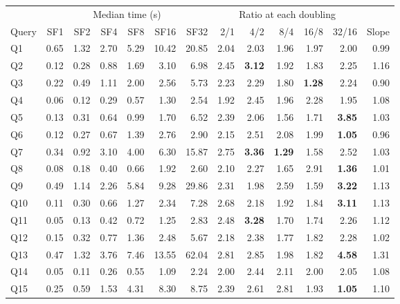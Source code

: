 \documentclass[11pt,a4paper]{article}
\begin{document}
\begin{table}[H]
\centering
\footnotesize
\setlength{\tabcolsep}{3.6pt}
\begin{tabular}{@{}lrrrrrrrrrrrr@{}}
\toprule
 & \multicolumn{6}{c}{Median time (s)} & \multicolumn{5}{c}{Ratio at each doubling} & \\
\cmidrule(lr){2-7}\cmidrule(lr){8-12}
Query & SF1 & SF2 & SF4 & SF8 & SF16 & SF32 & 2/1 & 4/2 & 8/4 & 16/8 & 32/16 & Slope \\
\midrule
Q1  & 0.65 & 1.32 & 2.70  & 5.29  & 10.42 & 20.85 & 2.04 & 2.03 & 1.96 & 1.97 & 2.00 & 0.99 \\
Q2  & 0.12 & 0.28 & 0.88  & 1.69  & 3.10  & 6.98  & 2.45 & \textbf{3.12} & 1.92 & 1.83 & 2.25 & 1.16 \\
Q3  & 0.22 & 0.49 & 1.11  & 2.00  & 2.56  & 5.73  & 2.23 & 2.29 & 1.80 & \textbf{1.28} & 2.24 & 0.90 \\
Q4  & 0.06 & 0.12 & 0.29  & 0.57  & 1.30  & 2.54  & 1.92 & 2.45 & 1.96 & 2.28 & 1.95 & 1.08 \\
Q5  & 0.13 & 0.31 & 0.64  & 0.99  & 1.70  & 6.52  & 2.39 & 2.06 & 1.56 & 1.71 & \textbf{3.85} & 1.03 \\
Q6  & 0.12 & 0.27 & 0.67  & 1.39  & 2.76  & 2.90  & 2.15 & 2.51 & 2.08 & 1.99 & \textbf{1.05} & 0.96 \\
Q7  & 0.34 & 0.92 & 3.10  & 4.00  & 6.30  & 15.87 & 2.75 & \textbf{3.36} & \textbf{1.29} & 1.58 & 2.52 & 1.03 \\
Q8  & 0.08 & 0.18 & 0.40  & 0.66  & 1.92  & 2.60  & 2.10 & 2.27 & 1.65 & 2.91 & \textbf{1.36} & 1.01 \\
Q9  & 0.49 & 1.14 & 2.26  & 5.84  & 9.28  & 29.86 & 2.31 & 1.98 & 2.59 & 1.59 & \textbf{3.22} & 1.13 \\
Q10 & 0.11 & 0.30 & 0.66  & 1.27  & 2.34  & 7.28  & 2.68 & 2.18 & 1.92 & 1.84 & \textbf{3.11} & 1.13 \\
Q11 & 0.05 & 0.13 & 0.42  & 0.72  & 1.25  & 2.83  & 2.48 & \textbf{3.28} & 1.70 & 1.74 & 2.26 & 1.12 \\
Q12 & 0.15 & 0.32 & 0.77  & 1.36  & 2.48  & 5.67  & 2.18 & 2.38 & 1.77 & 1.82 & 2.28 & 1.02 \\
Q13 & 0.47 & 1.32 & 3.76  & 7.46  & 13.55 & 62.04 & 2.81 & 2.85 & 1.98 & 1.82 & \textbf{4.58} & 1.31 \\
Q14 & 0.05 & 0.11 & 0.26  & 0.55  & 1.09  & 2.24  & 2.00 & 2.44 & 2.11 & 2.00 & 2.05 & 1.08 \\
Q15 & 0.25 & 0.59 & 1.53  & 4.31  & 8.30  & 8.75  & 2.39 & 2.61 & 2.81 & 1.93 & \textbf{1.05} & 1.10 \\

\end{tabular}
\end{table}
\end{document}
